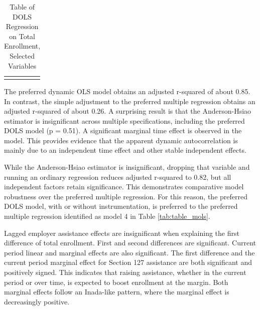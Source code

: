 \documentclass[review]{elsarticle}
\begin{document}
    \begin{table}
        \caption{Table of DOLS Regression on Total Enrollment, Selected Variables}
        \begin{tabularx}{\textwidth}{X}
            \centering
            
        \end{tabularx}
        \label{tab:table_dols}
        \end{table}

    The preferred dynamic OLS model obtains an adjusted r-squared of about 0.85.
    In contrast, the simple adjustment to the preferred multiple regression
    obtains an adjusted r-squared of about 0.26.
    A surprising result is that the Anderson-Hsiao estimator is insignificant
    across multiple specifications, including the preferred DOLS model (p = 0.51).
    A significant marginal time effect is observed in the model.
    This provides evidence that the apparent dynamic autocorrelation is
    mainly due to an independent time effect and other stable independent effects.
    
    While the Anderson-Hsiao estimator is insignificant,
    dropping that variable and running an ordinary regression reduces adjusted r-squared to 0.82,
    but all independent factors retain significance.
    This demonstrates comparative model robustness over the preferred multiple regression.
    For this reason, the preferred DOLS model, with or without instrumentation,
    is preferred to the preferred multiple regression identified as
    model 4 in Table \ref{tab:table_mols}.

    Lagged employer assistance effects are insignificant when explaining the first difference of total enrollment.
    First and second differences are significant.
    Current period linear and marginal effects are also significant.
    The first difference and the current period marginal effect for
    Section 127 assistance are both significant and positively signed.
    This indicates that raising assistance,
    whether in the current period or over time,
    is expected to boost enrollment at the margin.
    Both marginal effects follow an Inada-like pattern, where the marginal effect is decreasingly positive.
\end{document}
